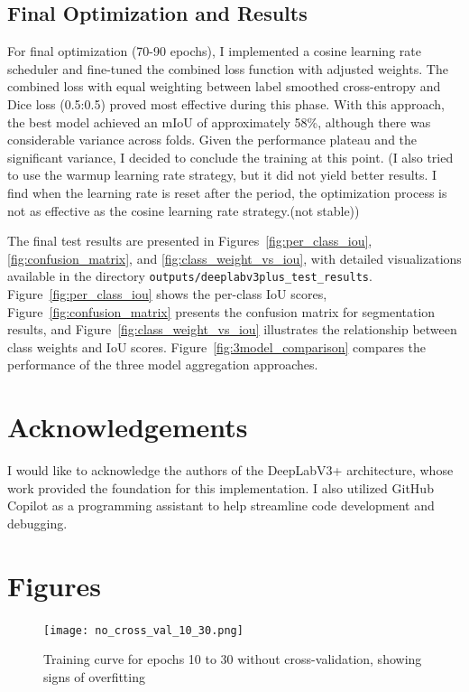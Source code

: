 \documentclass[]{article}
\begin{document}
\subsection{Final Optimization and Results}
For final optimization (70-90 epochs), I implemented a cosine learning rate scheduler and fine-tuned the combined loss function with adjusted weights. The combined loss with equal weighting between label smoothed cross-entropy and Dice loss (0.5:0.5) proved most effective during this phase. With this approach, the best model achieved an mIoU of approximately 58\%, although there was considerable variance across folds. Given the performance plateau and the significant variance, I decided to conclude the training at this point. (I also tried to use the warmup learning rate strategy, but it did not yield better results. I find when the learning rate is reset after the period, the optimization process is not as effective as the cosine learning rate strategy.(not stable))

The final test results are presented in Figures~\ref{fig:per_class_iou}, \ref{fig:confusion_matrix}, and \ref{fig:class_weight_vs_iou}, with detailed visualizations available in the directory \texttt{outputs/deeplabv3plus\_test\_results}. Figure~\ref{fig:per_class_iou} shows the per-class IoU scores, Figure~\ref{fig:confusion_matrix} presents the confusion matrix for segmentation results, and Figure~\ref{fig:class_weight_vs_iou} illustrates the relationship between class weights and IoU scores. Figure~\ref{fig:3model_comparison} compares the performance of the three model aggregation approaches.


\section{Acknowledgements}
I would like to acknowledge the authors of the DeepLabV3+ architecture, whose work provided the foundation for this implementation. I also utilized GitHub Copilot as a programming assistant to help streamline code development and debugging.
\section{Figures}

\begin{figure}[htbp]
		\centering
		\texttt{[image: no\_cross\_val\_10\_30.png]}
		\caption{Training curve for epochs 10 to 30 without cross-validation, showing signs of overfitting}
		\label{fig:no_cross_val_10_30}
\end{figure}
\end{document}

